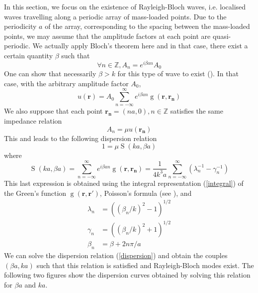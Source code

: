 \documentclass[11pt]{report}
\numberwithin{equation}{section}
\begin{document}
In this section, we focus on the existence of Rayleigh-Bloch waves, i.e. localised waves travelling along a periodic array of mass-loaded points. Due to the periodicity $a$ of the array, corresponding to the spacing between the mass-loaded points, we may assume that the amplitude factors at each point are quasi-periodic. We actually apply Bloch's theorem here and in that case, there exist a certain quantity $\beta$ such that
%
\begin{equation}
    \forall n \in \mathbb{Z}, A_n = e^{i\beta a n}A_0
\end{equation}
%
One can show that necessarily $\beta > k$ for this type of wave to exist (\cite{evans2007penetration}). In that case, with the arbitrary amplitude factor $A_0$,
%
\begin{equation} \label{RB}
    u(\bm{r}) = A_0 \sum_{n=-\infty}^{\infty} e^{i\beta a n} \operatorname{g}(\bm{r},\bm{r_n})
\end{equation}
%
We also suppose that each point $\bm{r_n} = (na, 0), n \in \mathbb{Z}$ satisfies the same impedance relation
%
\begin{equation}
    A_n = \mu u(\bm{r_n})
\end{equation}
%
This and  leads to the following dispersion relation
%
\begin{equation} \label{dispersion}
    1 = \mu \operatorname{S}(ka,\beta a)
\end{equation}
%
where
%
\begin{equation}
    \operatorname{S}(ka,\beta a) = \sum_{n=-\infty}^{\infty} e^{i\beta a n} \operatorname{g}(\bm{r},\bm{r_n}) = \frac {1} {4 k^3 a} \sum_{n=-\infty}^{\infty} (\lambda_n^{-1} - \gamma_n^{-1})
\end{equation}
%
This last expression is obtained using the integral representation (\ref{integral}) of the Green's function $\operatorname{g}(\bm{r},\bm{r'})$, Poisson's formula (see \cite{evans2007penetration}), and
%
\begin{align*} 
\lambda_n &= ((\beta_n/k)^2-1)^{1/2} \\ 
\gamma_n &= ((\beta_n/k)^2+1)^{1/2} \\
\beta_n &= \beta + {2 n \pi}/a 
\end{align*}
%
We can solve the dispersion relation (\ref{dispersion}) and obtain the couples $(\beta a, k a)$ such that this relation is satisfied and Rayleigh-Bloch modes exist. The following two figures show the dispersion curves obtained by solving this relation for $\beta a$ and $k a$.
\end{document}
